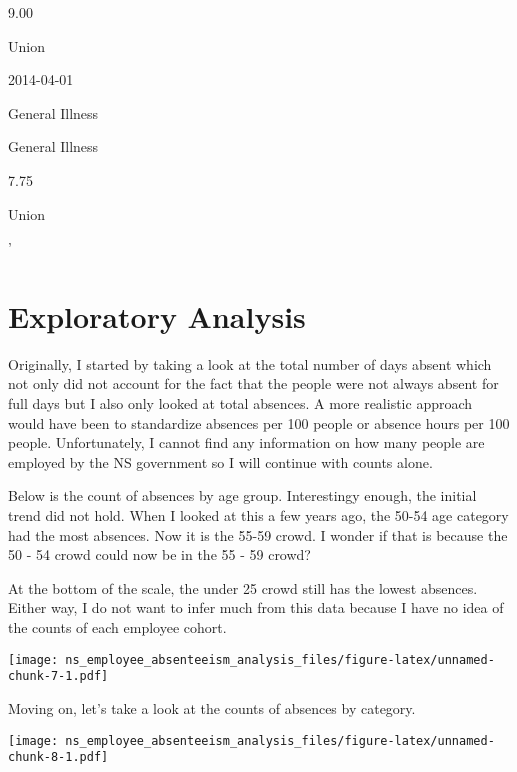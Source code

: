 \documentclass[
]{article}
\begin{document}
9.00

\n      

Union

\n    

\n    

\n      

2014-04-01

\n      

General Illness

\n      

General Illness

\n      

7.75

\n      

Union

\n    

\n  

\n

'

\hypertarget{exploratory-analysis}{%
\section{Exploratory Analysis}\label{exploratory-analysis}}

Originally, I started by taking a look at the total number of days
absent which not only did not account for the fact that the people were
not always absent for full days but I also only looked at total
absences. A more realistic approach would have been to standardize
absences per 100 people or absence hours per 100 people. Unfortunately,
I cannot find any information on how many people are employed by the NS
government so I will continue with counts alone.

Below is the count of absences by age group. Interestingy enough, the
initial trend did not hold. When I looked at this a few years ago, the
50-54 age category had the most absences. Now it is the 55-59 crowd. I
wonder if that is because the 50 - 54 crowd could now be in the 55 - 59
crowd?

At the bottom of the scale, the under 25 crowd still has the lowest
absences. Either way, I do not want to infer much from this data because
I have no idea of the counts of each employee cohort.

\texttt{[image: ns\_employee\_absenteeism\_analysis\_files/figure-latex/unnamed-chunk-7-1.pdf]}

Moving on, let's take a look at the counts of absences by category.

\texttt{[image: ns\_employee\_absenteeism\_analysis\_files/figure-latex/unnamed-chunk-8-1.pdf]}
\end{document}
